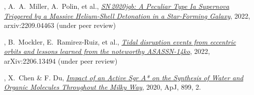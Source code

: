 


\begin{cvpubs}


\cvpub
{ %
\begin{cvitems}
\item {{\bf \color{darktext}{C.~Liu}}, A.~A.~Miller, A.~Polin, et al., \href{https://arxiv.org/abs/2209.04463}{\textit{SN\,2020jgb: A Peculiar Type Ia Supernova Triggered by a Massive Helium-Shell Detonation in a Star-Forming Galaxy}}, 2022, arxiv:2209.04463 (under peer review)}
\item {{\bf \color{darktext}{C.~Liu}}, B.~Mockler, E.~Ramirez-Ruiz, et al., \href{https://arxiv.org/abs/2206.13494}{\textit{Tidal disruption events from eccentric orbits and lessons learned from the noteworthy ASASSN-14ko}}, 2022, arXiv:2206.13494 (under peer review)}
\item {{\bf \color{darktext}{C.~Liu}}, X.~Chen \& F. Du, \href{https://iopscience.iop.org/article/10.3847/1538-4357/aba758}{\textit{Impact of an Active Sgr A* on the Synthesis of Water and Organic Molecules Throughout the Milky Way}}, 2020, ApJ, 899, 2.}
\end{cvitems}
}


\end{cvpubs}